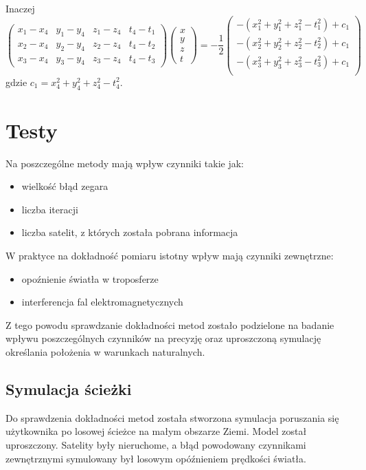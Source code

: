 \documentclass{article}
\begin{document}
Inaczej
$$
\begin{pmatrix}
x_1-x_4 & y_1-y_4 & z_1-z_4 & t_4-t_1 \\
x_2-x_4 & y_2-y_4 & z_2-z_4 & t_4-t_2 \\
x_3-x_4 & y_3-y_4 & z_3-z_4 & t_4-t_3
\end{pmatrix}
\begin{pmatrix}
x \\ y \\ z \\ t
\end{pmatrix}
=
-\frac{1}{2}
\begin{pmatrix}
-(x_1^2+y_1^2+z_1^2-t_1^2)+c_1 \\
-(x_2^2+y_2^2+z_2^2-t_2^2)+c_1 \\
-(x_3^2+y_3^2+z_3^2-t_3^2)+c_1 \\
\end{pmatrix}
$$
gdzie $c_1=x_4^2+y_4^2+z_4^2-t_4^2$.

\section{Testy}

Na poszczególne metody mają wpływ czynniki takie jak:
	\begin{itemize}
		\item wielkość błąd zegara
		\item liczba iteracji
		\item liczba satelit, z których została pobrana informacja
	\end{itemize}
W praktyce na dokładność pomiaru istotny wpływ mają czynniki zewnętrzne:
	\begin{itemize}
		\item opoźnienie światła w troposferze
		\item interferencja fal elektromagnetycznych
	\end{itemize}
Z tego powodu sprawdzanie dokładności metod zostało podzielone na badanie wpływu poszczególnych czynników na precyzję oraz uproszczoną symulację określania położenia w warunkach naturalnych.

\subsection{Symulacja ścieżki}

\par Do sprawdzenia dokładności metod została stworzona symulacja poruszania się użytkownika po losowej ścieżce na małym obszarze Ziemi. Model został uproszczony. Satelity były nieruchome, a błąd powodowany czynnikami zewnętrznymi symulowany był losowym opóźnieniem prędkości światła.
\end{document}
